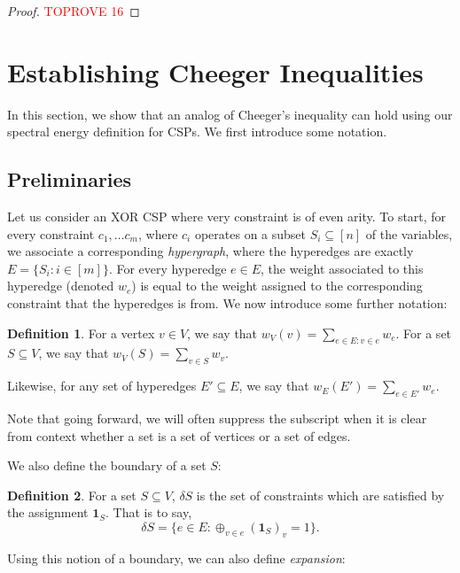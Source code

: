 \documentclass[11pt]{article}
\theoremstyle{definition}
\newtheorem{definition}{Definition}[section]
\begin{document}
\begin{proof}\textcolor{red}{TOPROVE 16}\end{proof}

\section{Establishing Cheeger Inequalities}\label{sec:cheeger}

In this section, we show that an analog of Cheeger's inequality can hold using our spectral energy definition for CSPs. We first introduce some notation.

\subsection{Preliminaries}

Let us consider an XOR CSP where very constraint is of even arity. To start, for every constraint $c_1, \dots c_m$, where $c_i$ operates on a subset $S_i \subseteq [n]$ of the variables, we associate a corresponding \emph{hypergraph}, where the hyperedges are exactly $E = \{S_i: i \in [m]\}$. For every hyperedge $e \in E$, the weight associated to this hyperedge (denoted $w_e$) is equal to the weight assigned to the corresponding constraint that the hyperedges is from. We now introduce some further notation:

\begin{definition}
    For a vertex $v \in V$, we say that $w_V(v) = \sum_{e \in E: v \in e} w_e$. For a set $S \subseteq V$, we say that $w_V(S) = \sum_{v \in S} w_v$.

    Likewise, for any set of hyperedges $E' \subseteq E$, we say that $w_E(E') = \sum_{e \in E'} w_e$.

    Note that going forward, we will often suppress the subscript when it is clear from context whether a set is a set of vertices or a set of edges. 
\end{definition}

We also define the boundary of a set $S$:

\begin{definition}
    For a set $S \subseteq V$, $\delta S$ is the set of constraints which are satisfied by the assignment $\mathbf{1}_S$. That is to say,
    \[
    \delta S = \{e \in E: \oplus_{v \in e} (\mathbf{1}_S)_v = 1 \}.
    \]
\end{definition}

Using this notion of a boundary, we can also define \emph{expansion}:
\end{document}
